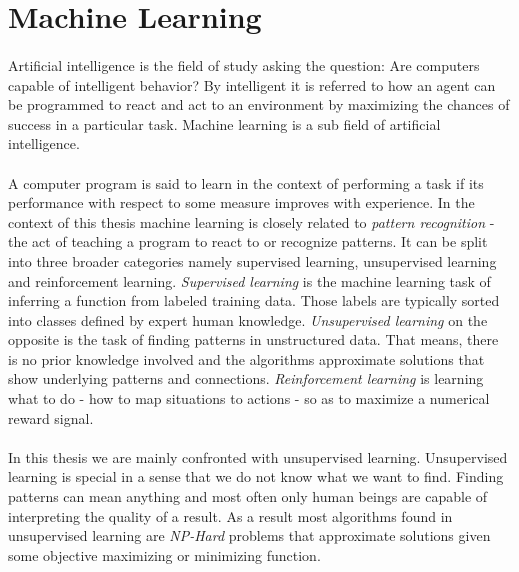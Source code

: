 \section{Machine Learning}
\label{sec:ml_intro}
  \paragraph{} Artificial intelligence is the field of study asking the question: Are computers capable of intelligent behavior? By intelligent it is referred to how an agent can be programmed to react and act to an environment by maximizing the chances of success in a particular task. Machine learning is a sub field of artificial intelligence.

  \paragraph{} A computer program is said to learn in the context of performing a task if its performance with respect to some measure improves with experience. In the context of this thesis machine learning is closely related to \emph{pattern recognition} - the act of teaching a program to react to or recognize patterns. It can be split into three broader categories namely supervised learning, unsupervised learning and reinforcement learning. \emph{Supervised learning} is the machine learning task of inferring a function from labeled training data. Those labels are typically sorted into classes defined by expert human knowledge. \emph{Unsupervised learning} on the opposite is the task of finding patterns in unstructured data. That means, there is no prior knowledge involved and the algorithms approximate solutions that show underlying patterns and connections. \emph{Reinforcement learning} is learning what to do - how to map situations to actions - so as to maximize a numerical reward signal.

  \paragraph{} In this thesis we are mainly confronted with unsupervised learning. Unsupervised learning is special in a sense that we do not know what we want to find. Finding patterns can mean anything and most often only human beings are capable of interpreting the quality of a result. As a result most algorithms found in unsupervised learning are \emph{NP-Hard} problems that approximate solutions given some objective maximizing or minimizing function.

